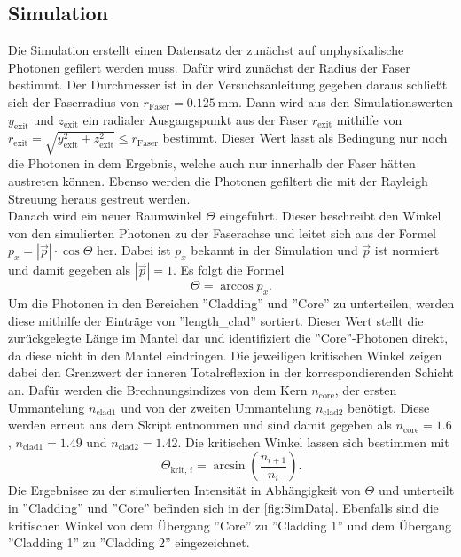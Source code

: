  \subsection{Simulation}
 \label{sec:sim}
 Die Simulation erstellt einen Datensatz der zunächst auf unphysikalische Photonen gefilert werden muss. Dafür wird zunächst der Radius der Faser bestimmt. Der Durchmesser ist in der Versuchsanleitung \cite{anleitung} gegeben daraus schließt sich der Faserradius von $r_{\text{Faser}} = \SI{0.125}{\milli\meter}$. Dann wird aus den Simulationswerten $y_{\text{exit}}$ und $z_{\text{exit}}$ ein radialer Ausgangspunkt aus der Faser $r_{\text{exit}}$ mithilfe von $r_{\text{exit}} = \sqrt{y_{\text{exit}}^2 + z_{\text{exit}}^2} \leq r_{\text{Faser}}$ bestimmt. Dieser Wert lässt als Bedingung nur noch die Photonen in dem Ergebnis, welche auch nur innerhalb der Faser hätten austreten können. Ebenso werden die Photonen gefiltert die mit der Rayleigh Streuung heraus gestreut werden.\\
 Danach wird ein neuer Raumwinkel $\Theta$ eingeführt. Dieser beschreibt den Winkel von den simulierten Photonen zu der Faserachse und leitet sich aus der Formel $p_x = |\vec{p}| \cdot \cos{\Theta}$ her. Dabei ist $p_x$ bekannt in der Simulation und $\vec{p}$ ist normiert und damit gegeben als $|\vec{p}| = 1$. Es folgt die Formel
 \begin{equation*}
    \Theta = \arccos{p_x}.
    \label{eqn:theta}
 \end{equation*}
Um die Photonen in den Bereichen ''Cladding'' und ''Core'' zu unterteilen, werden diese mithilfe der Einträge von ''length\_clad'' sortiert. Dieser Wert stellt die zurückgelegte Länge im Mantel dar und identifiziert die ''Core''-Photonen direkt, da diese nicht in den Mantel eindringen. Die jeweiligen kritischen Winkel zeigen dabei den Grenzwert der inneren Totalreflexion in der korrespondierenden Schicht an. Dafür werden die Brechnungsindizes von dem Kern $n_{\text{core}}$, der ersten Ummantelung $n_{\text{clad1}}$ und von der zweiten Ummantelung $n_{\text{clad2}}$ benötigt. Diese werden erneut aus dem Skript entnommen \cite{anleitung} und sind damit gegeben als $n_{\text{core}} = \num{1.6}$, $n_{\text{clad1}} = \num{1.49}$ und $n_{\text{clad2}} = \num{1.42}$. Die kritischen Winkel lassen sich bestimmen mit
 \begin{equation*}
    \Theta_{\text{krit, }i} = \arcsin{\left(\frac{n_{i+1}}{n_i}\right)}.
    \label{eqn:theta_krit}
 \end{equation*}
Die Ergebnisse zu der simulierten Intensität in Abhängigkeit von $\Theta$ und unterteilt in ''Cladding'' und ''Core'' befinden sich in der \autoref{fig:SimData}. Ebenfalls sind die kritischen Winkel von dem Übergang ''Core'' zu ''Cladding 1'' und dem Übergang ''Cladding 1'' zu ''Cladding 2'' eingezeichnet.
